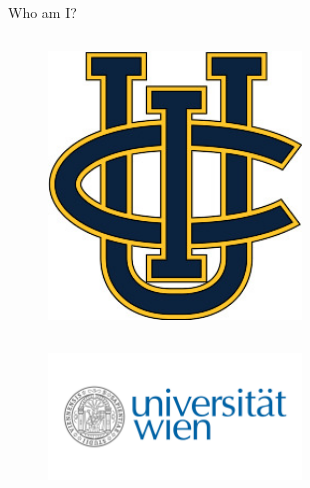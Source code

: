 \begin{frame}{Who am I?}
\begin{columns}
\begin{column}[T]{0.3\textwidth}
\begin{columns}
\begin{column}[T, onlytextwidth]{0.5\textwidth}
\begin{figure}
          \includegraphics[width=0.6\textwidth]{
            slides/assets/who-am-i-uci.jpg
          }

        \end{figure}

      \end{column}

    \end{columns}

    \begin{figure}

      \includegraphics[width=0.6\textwidth]{
        slides/assets/who-am-i-university-vienna.jpg
      }

    \end{figure}
  
  \end{column}

\end{columns}

\end{frame}
